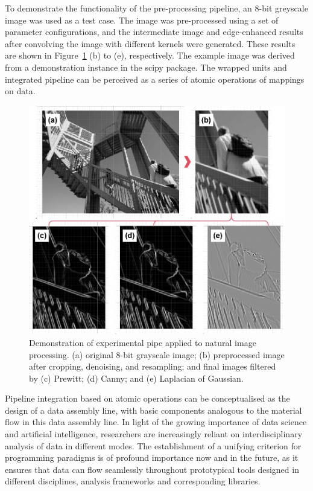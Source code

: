 \documentclass[a4paper,12pt]{article}
\newcommand{\myfig}[1]{{\color{black}Figure~\ref{#1}}}
\begin{document}


To demonstrate the functionality of the pre-processing pipeline, an 8-bit greyscale image was used as a test case. The image was pre-processed using a set of parameter configurations, and the intermediate image and edge-enhanced results after convolving the image with different kernels were generated. These results are shown in \myfig{tag13} (b) to (e), respectively. The example image was derived from a demonstration instance in the scipy package. The wrapped units and integrated pipeline can be perceived as a series of atomic operations of mappings on data.\par

\begin{figure}[htbp]
  \centering
  \includegraphics[scale=0.58]{experiment.jpg}
  \caption{Demonstration of experimental pipe applied to natural image processing. (a) original 8-bit grayscale image; (b) preprocessed image after cropping, denoising, and resampling; and final images filtered by (c) Prewitt; (d) Canny; and (e) Laplacian of Gaussian.}
  \label{tag13}
\end{figure}

Pipeline integration based on atomic operations can be conceptualised as the design of a data assembly line, with basic components analogous to the material flow in this data assembly line. In light of the growing importance of data science and artificial intelligence, researchers are increasingly reliant on interdisciplinary analysis of data in different modes. The establishment of a unifying criterion for programming paradigms is of profound importance now and in the future, as it ensures that data can flow seamlessly throughout prototypical tools designed in different disciplines, analysis frameworks and corresponding libraries.\par
\end{document}
